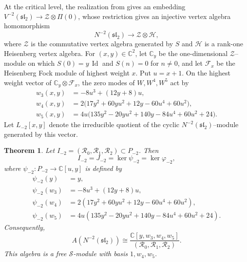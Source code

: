 \documentclass[11 pt]{amsart}
\newtheorem{theorem}{Theorem}
\theoremstyle{definition}
\theoremstyle{plain}
\begin{document}
At the critical level, the realization from \cite{A2019} gives an
embedding $V^{-2}(\mathfrak{sl}_2)\longrightarrow
\mathcal Z\otimes\Pi(0)$, whose restriction gives an injective vertex
algebra homomorphism
\begin{equation}
N^{-2}(\mathfrak{sl}_2)\longrightarrow \mathcal Z\otimes\mathcal H, \label{critical-2}
\end{equation}
where $\mathcal Z$ is the commutative vertex algebra generated by $S$
and $\mathcal H$ is a rank-one Heisenberg vertex algebra. For
$(x,y)\in\mathbb C^2$, let $\mathbb C_y$ be the one-dimensional
$\mathcal Z$--module on which $S(0)=y\,\operatorname{Id}$ and
$S(n)=0$ for $n\neq0$,
and let $\mathcal F_x$ be the Heisenberg Fock module of highest weight
$x$.
Put $u=x+1$.
On the highest weight vector of $\mathbb C_y\otimes\mathcal F_x$, the
zero modes of $W,W^4,W^5$ act by
\begin{align}
w_3(x,y)&=-8u^3+(12y+8)u,\label{eq:critical-w3}\\
w_4(x,y)&=
2\bigl(17y^2+60yu^2+12y-60u^4+60u^2\bigr),
\label{eq:critical-w4}\\
w_5(x,y)&=
4u\bigl(135y^2-20yu^2+140y-84u^4+60u^2+24\bigr).
\label{eq:critical-w5}
\end{align}
Let $L_{-2}[x,y]$ denote the irreducible quotient of the cyclic
$N^{-2}(\mathfrak{sl}_2)$--module generated by this vector.

\begin{theorem}\label{thm:critical-zhu-presentation}
Let $I_{-2}=(\mathcal R_0,\mathcal R_1,\mathcal R_2)\subset P_{-2}$.
Then
\[
I_{-2}=J_{-2}=\ker\psi_{-2}=\ker\varphi_{-2},
\]
where $\psi_{-2}:P_{-2}\to\mathbb C[u,y]$ is defined by
\begin{align*}
\psi_{-2}(y)&=y,\\
\psi_{-2}(w_3)&=-8u^3+(12y+8)u,\\
\psi_{-2}(w_4)&=
2(17y^2+60yu^2+12y-60u^4+60u^2),\\
\psi_{-2}(w_5)&=
4u(135y^2-20yu^2+140y-84u^4+60u^2+24).
\end{align*}
Consequently,
\[
A(N^{-2}(\mathfrak{sl}_2))
\cong
\frac{\mathbb C[y,w_3,w_4,w_5]}
{(\mathcal R_0,\mathcal R_1,\mathcal R_2)}.
\]
This algebra is a free $\mathcal S$-module with basis  $1,w_4,w_5$.
\end{theorem}
\end{document}
